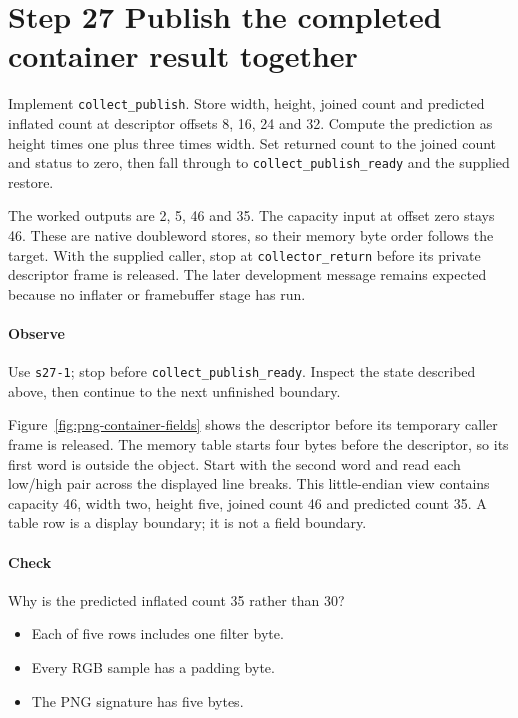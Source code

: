 \section{Step 27 Publish the completed container result together}\label{png-collect-s27}
Implement \texttt{collect\_publish}. Store width, height, joined count and predicted inflated count at descriptor offsets 8, 16, 24 and 32. Compute the prediction as height times one plus three times width. Set returned count to the joined count and status to zero, then fall through to \texttt{collect\_publish\_ready} and the supplied restore.

The worked outputs are 2, 5, 46 and 35. The capacity input at offset zero stays 46. These are native doubleword stores, so their memory byte order follows the target. With the supplied caller, stop at \texttt{collector\_return} before its private descriptor frame is released. The later development message remains expected because no inflater or framebuffer stage has run.

\paragraph{Observe} Use \texttt{s27-1}; stop before \texttt{collect\_publish\_ready}. Inspect the state described above, then continue to the next unfinished boundary.

Figure~\ref{fig:png-container-fields} shows the descriptor before its temporary
caller frame is released. The memory table starts four bytes before the descriptor,
so its first word is outside the object. Start with the second word and read each
low/high pair across the displayed line breaks. This little-endian view contains
capacity 46, width two, height five, joined count 46 and predicted count 35. A table
row is a display boundary; it is not a field boundary.


\clearpage

\paragraph{Check} Why is the predicted inflated count 35 rather than 30?
\begin{itemize}
  \item[A.] Each of five rows includes one filter byte.
  \item[B.] Every RGB sample has a padding byte.
  \item[C.] The PNG signature has five bytes.
\end{itemize}

